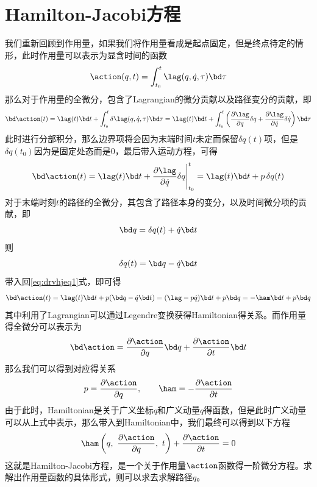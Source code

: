 \section{Hamilton-Jacobi方程}
\label{sec:Ham_Jacobi}
我们重新回顾到作用量，如果我们将作用量看成是起点固定，但是终点待定的情形，此时作用量可以表示为显含时间的函数
\begin{equation}
    \action(q,t) = \int_{t_0}^{t}\lag(q,\dot q,\tau)\bd \tau
\end{equation}
那么对于作用量的全微分，包含了Lagrangian的微分贡献以及路径变分的贡献，即
\begin{equation}
    \bd \action(t) = \lag(t)\bd t + \int_{t_0}^{t}\delta\lag(q,\dot q,\tau)\bd\tau = \lag(t)\bd t + \int_{t_0}^{t}\left( \frac{\partial\lag}{\partial q}\delta q + \frac{\partial\lag}{\partial \dot q}\delta\dot q \right)\bd\tau 
\end{equation}
此时进行分部积分，那么边界项将会因为末端时间$t$未定而保留$\delta q(t)$项，但是$\delta q(t_0)$因为是固定处态而是0，最后带入运动方程，可得
\begin{equation}
    \bd \action(t) = \lag(t)\bd t+\frac{\partial\lag}{\partial\dot q}\delta q\Bigg|^t_{t_0} = \lag(t)\bd t+p\,\delta q(t)\label{eq:drvhjeq1}
\end{equation}
对于末端时刻$t$的路径的全微分，其包含了路径本身的变分，以及时间微分项的贡献，即
\begin{equation}
    \bd q =\delta q(t) + \dot q \bd t 
\end{equation}
则
\begin{equation}
    \delta q(t) = \bd q-\dot q \bd t 
\end{equation}
带入回\eqref{eq:drvhjeq1}式，即可得
\begin{equation}
    \bd \action(t) = \lag(t)\bd t+p( \bd q-\dot q \bd t ) = (\lag - p\dot q)\bd t + p\bd q  = -\ham \bd t  +p\bd q
\end{equation}
其中利用了Lagrangian可以通过Legendre变换获得Hamiltonian得关系。而作用量得全微分可以表示为
\begin{equation}
    \bd\action = \frac{\partial\action}{\partial q}\bd q + \frac{\partial\action}{\partial t}\bd t
    \end{equation}
    那么我们可以得到对应得关系
    \begin{equation}
        p = \frac{\partial\action}{\partial q},\qquad \ham = - \frac{\partial\action}{\partial t}
    \end{equation}
    由于此时，Hamiltonian是关于广义坐标$q$和广义动量$q$得函数，但是此时广义动量可以从上式中表示，那么带入到Hamiltonian中，我们最终可以得到以下方程
\begin{equation}
    \ham\left(q,~\frac{\partial\action}{\partial q},~t\right) + \frac{\partial \action}{\partial t}=0
\end{equation}
这就是Hamilton-Jacobi方程，是一个关于作用量$\action$函数得一阶微分方程。求解出作用量函数的具体形式，则可以求去求解路径$q$。


